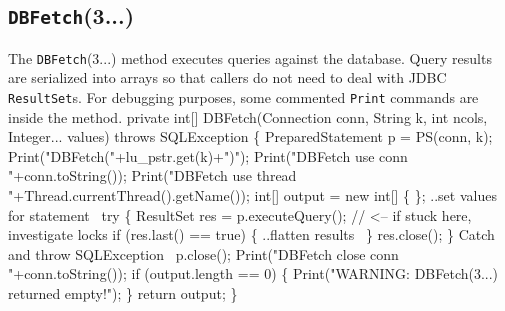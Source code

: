 \documentclass{article}
\def\nwendcode{\endtrivlist \endgroup}      %
\theoremstyle{definition}                   %
\begin{document}
\subsection{{\tt{}\protect{}DBFetch}(3...)}
The {\tt{}\protect{}DBFetch}(3...) method executes queries against the database. Query
results are serialized into arrays so that callers do not need to deal with
JDBC {\tt{}ResultSet}s. For debugging purposes, some commented {\tt{}\protect{}Print} commands
are inside the method.
\nwenddocs{}\endmoddef{}
private int[] DBFetch(Connection conn,
    String k, int ncols, Integer... values) throws SQLException \{
  PreparedStatement p = PS(conn, k);
  Print("DBFetch("+lu_pstr.get(k)+")");
  Print("DBFetch use conn "+conn.toString());
  Print("DBFetch use thread "+Thread.currentThread().getName());
  int[] output = new int[] \{ \};
  \LA{}..set values for statement~{\nwtagstyle{}}\RA{}
  try \{
    ResultSet res = p.executeQuery();  // <-- if stuck here, investigate locks
    if (res.last() == true) \{
      \LA{}..flatten results~{\nwtagstyle{}}\RA{}
    \}
    res.close();
  \}
  \LA{}Catch and throw \code{}SQLException\edoc{}~{\nwtagstyle{}}\RA{}
  p.close();
  Print("DBFetch close conn "+conn.toString());
  if (output.length == 0) \{
    Print("WARNING: DBFetch(3...) returned empty!");
  \}
  return output;
\}
\eatline
{}\nwendcode{}\endmoddef{}
\end{document}
